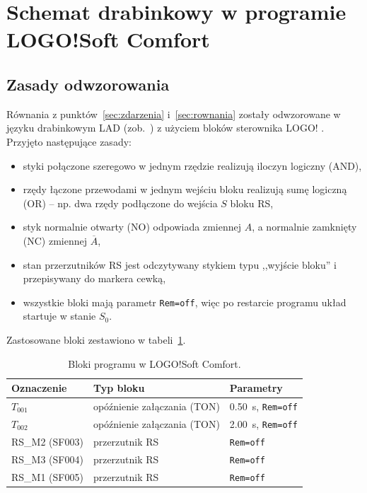 \section{Schemat drabinkowy w programie LOGO!Soft Comfort}
\label{sec:drabinka}

\subsection{Zasady odwzorowania}
Równania z punktów~\ref{sec:zdarzenia} i~\ref{sec:rownania} zostały
odwzorowane w języku drabinkowym LAD
(zob.~\cite{legierski,flaga}) z użyciem bloków sterownika LOGO!
\cite{logo}. Przyjęto następujące zasady:
\begin{itemize}
    \item styki połączone szeregowo w jednym rzędzie realizują
          iloczyn logiczny (AND),
    \item rzędy łączone przewodami w jednym wejściu bloku realizują
          sumę logiczną (OR) -- np. dwa rzędy podłączone do wejścia $S$
          bloku RS,
    \item styk normalnie otwarty (NO) odpowiada zmiennej $A$,
          a normalnie zamknięty (NC) zmiennej $\overline{A}$,
    \item stan przerzutników RS jest odczytywany stykiem typu
          ,,wyjście bloku'' i przepisywany do markera cewką,
    \item wszystkie bloki mają parametr \texttt{Rem=off}, więc po
          restarcie programu układ startuje w stanie $S_0$.
\end{itemize}
Zastosowane bloki zestawiono w tabeli~\ref{tab:bloki}.

\begin{table}[H]
\centering
\caption{Bloki programu w LOGO!Soft Comfort.}
\label{tab:bloki}
\begin{tabular}{lll}
\toprule
Oznaczenie & Typ bloku & Parametry \\
\midrule
$T_{001}$ & opóźnienie załączania (TON) & \SI{0,50}{\second}, \texttt{Rem=off} \\
$T_{002}$ & opóźnienie załączania (TON) & \SI{2,00}{\second}, \texttt{Rem=off} \\
RS\_M2 (SF003) & przerzutnik RS & \texttt{Rem=off} \\
RS\_M3 (SF004) & przerzutnik RS & \texttt{Rem=off} \\
RS\_M1 (SF005) & przerzutnik RS & \texttt{Rem=off} \\
\bottomrule
\end{tabular}
\end{table}

